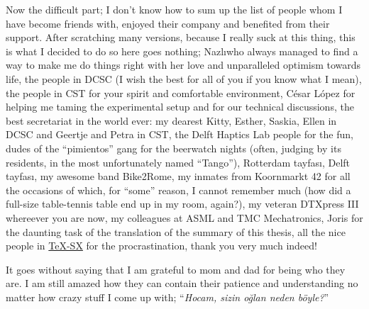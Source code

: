 Now the difficult part; I don't know how to sum up the list of people whom I have become friends with, enjoyed their company and benefited 
from their support. After scratching many versions, because I really suck at this thing, this is what I decided to do so here goes nothing; 
Nazl\i\space who always managed to find a way to make me do things right with her love and unparalleled optimism towards life, the people 
in DCSC (I wish the best for all of you if you know what I mean), the people in CST for your spirit and comfortable environment, C\'{e}sar 
L\'{o}pez for helping me taming the experimental setup and for our technical discussions, the best secretariat in the world ever: my dearest 
Kitty, Esther, Saskia, Ellen in DCSC and Geertje and Petra in CST, the Delft Haptics Lab people for the fun, dudes of the \enquote{pimientos} 
gang for the beerwatch nights (often, judging by its residents, in the most unfortunately named \enquote{Tango}), Rotterdam tayfas\i, Delft 
tayfas\i, my awesome band Bike2Rome, my inmates from Koornmarkt 42 for all the occasions of which, for \enquote{some} reason, I cannot 
remember much (how did a full-size table-tennis table end up in my room, again?), my veteran DTXpress III whereever you are now, my 
colleagues at ASML and TMC Mechatronics, Joris for the daunting task of the translation of the summary of this thesis, all the nice people 
in \href{http://tex.stackexchange.com}{\TeX-SX} for the procrastination, thank you very much indeed!


It goes without saying that I am grateful to mom and dad for being who they are. I am still amazed how they can contain their patience and 
understanding no matter how crazy stuff I come up with; \enquote{\emph{Hocam, sizin o\u{g}lan neden b\"{o}yle?}}